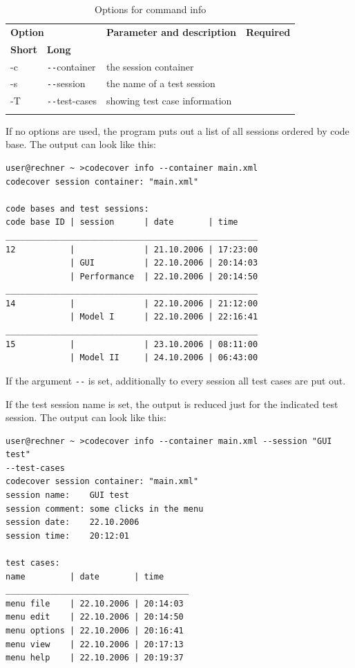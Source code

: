 \begin{longtable}{|l|l|p{73mm}|c|}\hline
   \multicolumn{2}{|l|}{\textbf{Option}} & 
   {\textbf{Parameter and description}} & 
   {\textbf{Required}} \\
   {\textbf{Short}} &
   {\textbf{Long}} &
    & 
    \\\hline \hline \endhead
   -c & \verb$--$container & the session container & \x \\\hline
   -s & \verb$--$session & the name of a test session &  \\\hline
   -T & \verb$--$test-cases & showing test case information &  \\\hline
  \caption{Options for command info}
  \label{fr_tb:Options for command info}
\end{longtable}
\par
If no options are used, the program puts out a list of all sessions ordered by code base. The output can look like this:
\newline \newline
\begin{minipage}[c]{0.9\textwidth}
\begin{verbatim}
user@rechner ~ >codecover info --container main.xml
codecover session container: "main.xml"

code bases and test sessions:
code base ID | session      | date       | time
___________________________________________________
12           |              | 21.10.2006 | 17:23:00
             | GUI          | 22.10.2006 | 20:14:03
             | Performance  | 22.10.2006 | 20:14:50
___________________________________________________
14           |              | 22.10.2006 | 21:12:00
             | Model I      | 22.10.2006 | 22:16:41
___________________________________________________
15           |              | 23.10.2006 | 08:11:00
             | Model II     | 24.10.2006 | 06:43:00
\end{verbatim}
\end{minipage}
\newline \newline
If the argument \verb$--$ is set, additionally to every session all test cases are put out.
\par
If the test session name is set, the output is reduced just for the indicated test session. The output can look like this:
\newline \newline
\begin{minipage}[c]{0.9\textwidth}
\begin{verbatim}
user@rechner ~ >codecover info --container main.xml --session "GUI test"
--test-cases
codecover session container: "main.xml"
session name:    GUI test
session comment: some clicks in the menu
session date:    22.10.2006
session time:    20:12:01

test cases:
name         | date       | time
_____________________________________
menu file    | 22.10.2006 | 20:14:03
menu edit    | 22.10.2006 | 20:14:50
menu options | 22.10.2006 | 20:16:41
menu view    | 22.10.2006 | 20:17:13
menu help    | 22.10.2006 | 20:19:37
\end{verbatim}
\end{minipage}
